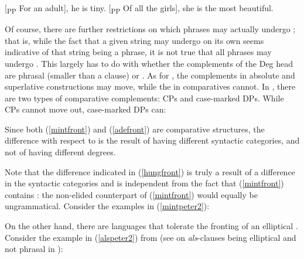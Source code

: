 \ea \label{fronting2}
\ea	{}[\textsubscript{PP} For an adult], he is tiny. \label{frontedabsarg}
\ex	{}[\textsubscript{PP} Of all the girls], she is the most beautiful. \label{frontedsuparg}
\z
\z

Of course, there are further restrictions on which phrases may actually undergo ; that is, while the fact that a given string may undergo  on its own seems indicative of that string being a phrase, it is not true that all phrases may undergo . This largely has to do with whether the complements of the Deg head are phrasal (smaller than a clause) or . As for , the  complements in absolute and superlative constructions may move, while the  in comparatives cannot. In , there are two types of comparative complements: CPs and case-marked DPs. While CPs cannot move out, case-marked DPs can:

\ea \label{hungfront}
\z
\z

Since both (\ref{mintfront}) and (\ref{adefront}) are comparative structures, the difference with respect to  is the result of having different syntactic categories, and not of having different degrees.

Note that the difference indicated in (\ref{hungfront}) is truly a result of a difference in the syntactic categories and is independent from the fact that (\ref{mintfront}) contains : the non-elided counterpart of (\ref{mintfront}) would equally be ungrammatical. Consider the examples in (\ref{mintpeter2}):

\z

On the other hand, there are languages that tolerate the fronting of an elliptical  . Consider the example in (\ref{alspeter2}) from  (see \citealt{bacskaiatkari2014alh} on \textit{als}-clauses being elliptical and not phrasal in ):

